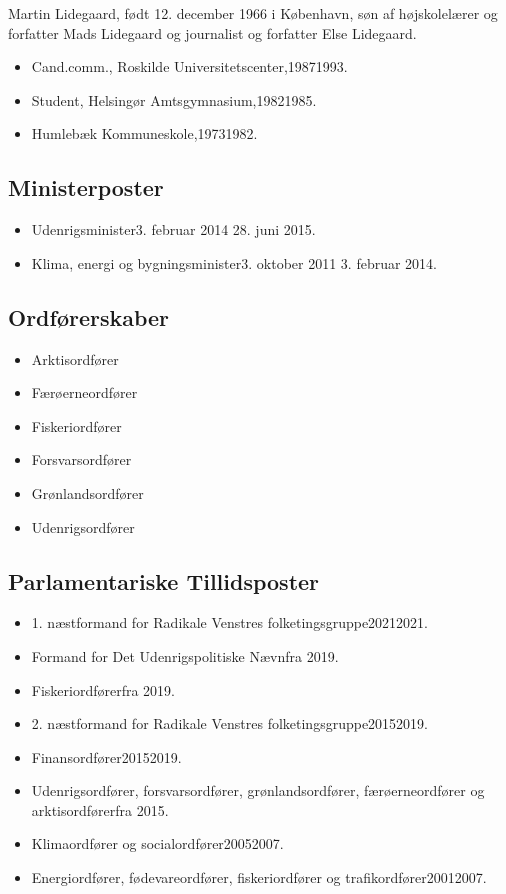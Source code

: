 \documentclass[11pt, a4paper]{awesome-cv}
\begin{document}
\makecvheader[R]
\makelettertitle
\begin{cvletter}
Martin Lidegaard, født 12. december 1966 i København, søn af højskolelærer og forfatter Mads Lidegaard og journalist og forfatter Else Lidegaard.

\begin{itemize}
\item Cand.comm., Roskilde Universitetscenter,19871993.
\item Student, Helsingør Amtsgymnasium,19821985.
\item Humlebæk Kommuneskole,19731982.
\end{itemize}
\subsection*{Ministerposter}
\begin{itemize}
\item Udenrigsminister3. februar 2014  28. juni 2015.
\item Klima, energi og bygningsminister3. oktober 2011  3. februar 2014.
\end{itemize}
\subsection*{Ordførerskaber}
\begin{itemize}
\item Arktisordfører
\item Færøerneordfører
\item Fiskeriordfører
\item Forsvarsordfører
\item Grønlandsordfører
\item Udenrigsordfører
\end{itemize}
\subsection*{Parlamentariske Tillidsposter}
\begin{itemize}
\item 1. næstformand for Radikale Venstres folketingsgruppe20212021.
\item Formand for Det Udenrigspolitiske Nævnfra 2019.
\item Fiskeriordførerfra 2019.
\item 2. næstformand for Radikale Venstres folketingsgruppe20152019.
\item Finansordfører20152019.
\item Udenrigsordfører, forsvarsordfører, grønlandsordfører, færøerneordfører og arktisordførerfra 2015.
\item Klimaordfører og socialordfører20052007.
\item Energiordfører, fødevareordfører, fiskeriordfører og trafikordfører20012007.
\end{itemize}

\end{cvletter}
\end{document}
